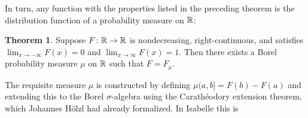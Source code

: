 \documentclass[leqno]{article}
\theoremstyle{definition}
\newtheorem{theorem}{Theorem}[section]
\begin{document}
In turn, any function with the properties listed in the preceding theorem is the distribution function of a probability measure on $\mathbb{R}$:

\begin{theorem}
Suppose $F\colon \mathbb{R} \rightarrow \mathbb{R}$ is nondecreasing, right-continuous, and satisfies $\lim_{x \rightarrow -\infty} F(x) = 0$ and $\lim_{x \rightarrow \infty} F(x) = 1$. Then there exists a Borel probability measure $\mu$ on $\mathbb{R}$ such that $F = F_\mu$.
\end{theorem}

The requisite measure $\mu$ is constructed by defining $\mu (a,b] = F(b) - F(a)$ and extending this to the Borel $\sigma$-algebra using the Carath\'eodory extension theorem, which Johannes H\"olzl had already formalized. In Isabelle this is

\medskip
\end{document}
